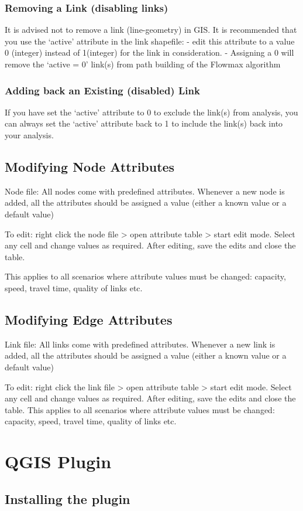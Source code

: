 \documentclass[
]{book}
\begin{document}
\section{Removing a Link (disabling links)}\label{removing-a-link-disabling-links}

It is advised not to remove a link (line-geometry) in GIS. It is recommended that you use the `active' attribute in the link shapefile: - edit this attribute to a value 0 (integer) instead of 1(integer) for the link in consideration.
- Assigning a 0 will remove the `active = 0' link(s) from path building of the Flowmax algorithm

\section{Adding back an Existing (disabled) Link}\label{adding-back-an-existing-disabled-link}

If you have set the `active' attribute to 0 to exclude the link(s) from analysis, you can always set the `active' attribute back to 1 to include the link(s) back into your analysis.

\chapter{Modifying Node Attributes}\label{modifying-node-attributes}

Node file: All nodes come with predefined attributes. Whenever a new node is added, all the attributes should be assigned a value (either a known value or a default value)

To edit: right click the node file \textgreater{} open attribute table \textgreater{} start edit mode. Select any cell and change values as required. After editing, save the edits and close the table.

This applies to all scenarios where attribute values must be changed: capacity, speed, travel time, quality of links etc.

\chapter{Modifying Edge Attributes}\label{modifying-edge-attributes}

Link file: All links come with predefined attributes. Whenever a new link is added, all the attributes should be assigned a value (either a known value or a default value)

To edit: right click the link file \textgreater{} open attribute table \textgreater{} start edit mode. Select any cell and change values as required. After editing, save the edits and close the table. This applies to all scenarios where attribute values must be changed: capacity, speed, travel time, quality of links etc.

\part{QGIS Plugin}\label{part-qgis-plugin}

\chapter{Installing the plugin}\label{installing-the-plugin}
\end{document}
